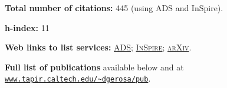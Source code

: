\documentclass[11pt,letterpaper,sans]{moderncv}
\begin{document}
\textbf{Total number of citations:} 445 (using ADS and InSpire).

\textbf{h-index:} 11


\textbf{Web links to list services:}
\href{http://labs.adsabs.harvard.edu/adsabs/search/?q=author%3A%22Gerosa%2C+Davide%22&month_from=&year_from=&month_to=&year_to=&db_f=&nr=&article=1&bigquery=&re_sort_type=CITED&re_sort_dir=desc}{\textsc{ADS}}; 
\href{http://inspirehep.net/search?ln=en&ln=en&p=exactauthor%3AD.Gerosa.1&of=hb&action_search=Search&sf=&so=d&rm=citation&rg=25&sc=0}{\textsc{InSpire}}; 
\href{http://arxiv.org/a/gerosa_d_1.html}{\textsc{arXiv}}.

\textbf{Full list of publications} available below and  at \href{http://www.tapir.caltech.edu/~dgerosa/pub}{\texttt{www.tapir.caltech.edu/\textasciitilde dgerosa/pub}}.






\vspace{+0.2cm}
\cvitem{\textcolor{color1}{Selected publications}}{}
\vspace{-0.7cm}
\end{document}

